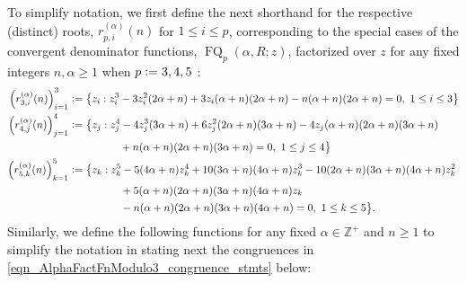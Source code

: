 \documentclass[12pt,reqno]{article}
\numberwithin{sfootnote}{section}
\numberwithin{equation}{section}
\theoremstyle{plain}
\theoremstyle{definition}
\theoremstyle{remark}
\newcommand{\cf}[0]{cf.\ }
\newcommand{\defequals}{\ensuremath{\vcentcolon=}}
\newcommand{\ConvFQ}[4]{\ensuremath{\FQ_{#1}\left(#2, #3; #4\right)}}
\DeclareMathOperator{\FQ}{FQ}
\begin{document}
To simplify notation, we first define the next shorthand for the respective 
(distinct) roots, $r_{p,i}^{(\alpha)}(n)$ for $1 \leq i \leq p$, 
corresponding to the special cases of the convergent denominator 
functions, $\ConvFQ{p}{\alpha}{R}{z}$, 
factorized over $z$ for any fixed integers $n, \alpha \geq 1$ 
when $p \defequals 3, 4, 5$ 
\citep[\S 1.11(iii); \cf \S 4.43]{NISTHB}: 
\begin{align} 
\notag 
\left( r_{3,i}^{(\alpha)}(n) \right)_{i=1}^{3} & \defequals 
     \left\{ z_i : z_i^3 -3 z_i^2 (2 \alpha +n)+3 z_i (\alpha +n) 
     (2 \alpha +n) - n (\alpha +n) (2 \alpha +n) = 0,\ 
     1 \leq i \leq 3 \right\} \\ 
\notag 
\left( r_{4,j}^{(\alpha)}(n) \right)_{j=1}^{4} & \defequals 
     \bigl\{ z_j : 
     z_j^4 - 4 z_j^3 (3 \alpha +n) + 
     6 z_j^2 (2 \alpha +n) (3 \alpha +n) - 
     4 z_j (\alpha +n) (2 \alpha +n) (3 \alpha +n) \\ 
\notag 
     & \phantom{\defequals \bigl( z_j : z_j^4\ } + 
     n (\alpha +n) (2 \alpha +n) (3 \alpha +n) = 0,\ 
     1 \leq j \leq 4 \bigr\} \\ 
\notag 
\left( r_{5,k}^{(\alpha)}(n) \right)_{k=1}^{5} & \defequals 
     \bigl\{ z_k : 
     z_k^5 - 5 (4 \alpha + n) z_k^4 + 
     10 (3 \alpha + n) (4 \alpha + n) z_k^3 - 
     10 (2 \alpha + n) (3 \alpha + n) (4 \alpha + n) z_k^2 \\ 
\notag 
     & \phantom{\defequals \bigl( z_k : z_k^5\ } + 
     5 (\alpha + n) (2 \alpha + n) (3 \alpha + n) (4 \alpha + n) z_k \\ 
\label{eqn_cor_AlphaFactMod3_orig_roots_eqn} 
     & \phantom{\defequals \bigl( z_k : z_k^5\ } - 
     n (\alpha + n) (2 \alpha + n) (3 \alpha + n) (4 \alpha + n) = 0,\ 
     1 \leq k \leq 5 \bigr\}. 
\end{align} 
Similarly, we define the following functions for any fixed 
$\alpha \in \mathbb{Z}^{+}$ and $n \geq 1$ to 
simplify the notation in stating next the congruences in 
\eqref{eqn_AlphaFactFnModulo3_congruence_stmts} below: 
\newcommand{\rootri}[2]{\ensuremath{r_{#1,#2}^{(-\alpha)}(n)}} 
\end{document}

